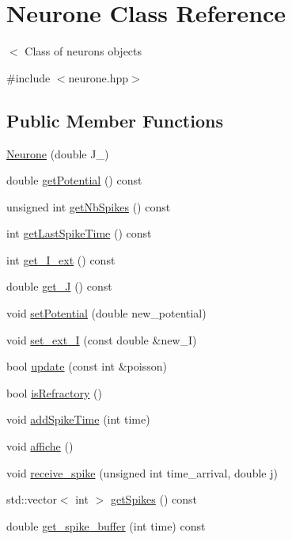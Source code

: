 \hypertarget{classNeurone}{\section{Neurone Class Reference}
\label{classNeurone}
}


$<$ Class of neurons objects  




{\ttfamily \#include $<$neurone.\-hpp$>$}

\subsection*{Public Member Functions}
\begin{DoxyCompactItemize}
\item 
\hyperlink{classNeurone_a47d575ac043af29b5d3071264372d794}{Neurone} (double J\-\_\-)
\item 
double \hyperlink{classNeurone_a81f418a2929da23aa6122014e67e977a}{get\-Potential} () const 
\item 
unsigned int \hyperlink{classNeurone_a8a2f3bfb5d8ee23baa9d2762621e3378}{get\-Nb\-Spikes} () const 
\item 
int \hyperlink{classNeurone_a4087ddf933a030150a47021b6cfa17b9}{get\-Last\-Spike\-Time} () const 
\item 
int \hyperlink{classNeurone_a1ab9d547a38bae61bf5c526a76f7f570}{get\-\_\-\-I\-\_\-ext} () const 
\item 
double \hyperlink{classNeurone_a0a1f8d8b3d7a13ea518fb502e474674f}{get\-\_\-\-J} () const 
\item 
void \hyperlink{classNeurone_a756fb380904ac62b6c9484779db12285}{set\-Potential} (double new\-\_\-potential)
\item 
void \hyperlink{classNeurone_a326b1657899bfa55f0e739fbcf28dd33}{set\-\_\-ext\-\_\-\-I} (const double \&new\-\_\-\-I)
\item 
bool \hyperlink{classNeurone_a77818d9f85c5576aa6c222816aaa2639}{update} (const int \&poisson)
\item 
bool \hyperlink{classNeurone_a332575021e6a883b253b6d09e3f74cb6}{is\-Refractory} ()
\item 
void \hyperlink{classNeurone_a547dd526baaf8757443c0ff8edd3ef07}{add\-Spike\-Time} (int time)
\item 
void \hyperlink{classNeurone_abd2b5e812d7790520480a8f2e96cb7bc}{affiche} ()
\item 
void \hyperlink{classNeurone_add5643c0abaa809b78e52b24978777a2}{receive\-\_\-spike} (unsigned int time\-\_\-arrival, double j)
\item 
std\-::vector$<$ int $>$ \hyperlink{classNeurone_a089b4052f5bd2eb77d081ba8399a9c7a}{get\-Spikes} () const 
\item 
double \hyperlink{classNeurone_ac5775ec28569770d61da92bd80400bd6}{get\-\_\-spike\-\_\-buffer} (int time) const 
\end{DoxyCompactItemize}


